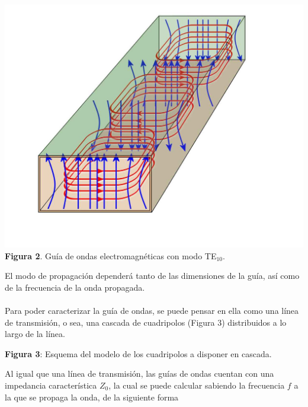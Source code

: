 \documentclass[11pt,a4paper]{article}
\begin{document}
\begin{multicols}{2}
\begin{center}
    \includegraphics[scale=0.15]{images/TE10.jpg} \\
    \textbf{Figura 2}. Guía de ondas electromagnéticas con modo TE$_{10}$.
\end{center}
El modo de propagación dependerá tanto de las dimensiones de la guía, así como de la frecuencia de la onda propagada. \\ \\
Para poder caracterizar la guía de ondas, se puede pensar en ella como una línea de transmisión, o sea, una cascada de cuadripolos (Figura 3) distribuidos a lo largo de la línea.
\begin{center}
\textbf{Figura 3}: Esquema del modelo de los cuadripolos a disponer en cascada.
\end{center}
Al igual que una línea de transmisión, las guías de ondas cuentan con una impedancia característica $Z_0$, la cual se puede calcular sabiendo la frecuencia $f$ a la que se propaga la onda, de la siguiente forma

\end{multicols}
\end{document}
